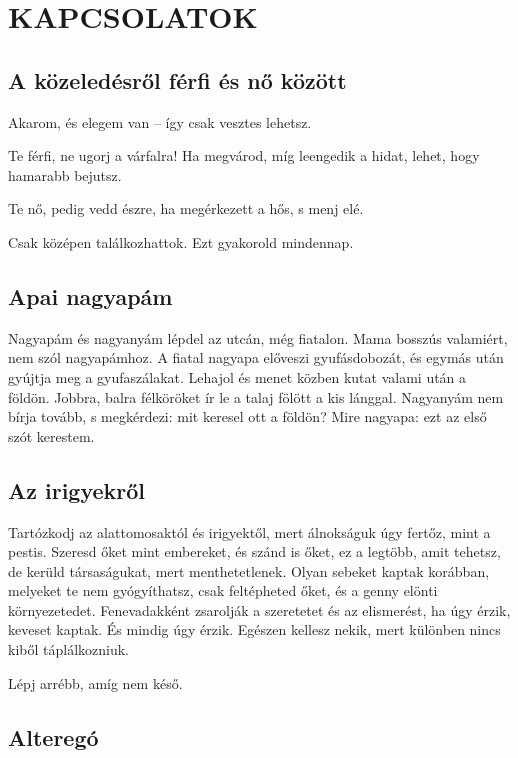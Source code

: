 \clearpage
\chapter{KAPCSOLATOK}

\section{A közeledésről férfi és nő között}

Akarom, és elegem van -- így csak vesztes lehetsz.

Te férfi, ne ugorj a várfalra! Ha megvárod, míg leengedik a hidat,
lehet, hogy hamarabb bejutsz.

Te nő, pedig vedd észre, ha megérkezett a hős, s menj elé.

Csak középen találkozhattok. Ezt gyakorold mindennap.

\section{Apai nagyapám}

Nagyapám és nagyanyám lépdel az utcán, még fiatalon. Mama
bosszús valamiért, nem szól nagyapámhoz. A fiatal nagyapa előveszi
gyufásdobozát, és egymás után gyújtja meg a gyufaszálakat. Lehajol és
menet közben kutat valami után a földön. Jobbra, balra félköröket ír le
a talaj fölött a kis lánggal. Nagyanyám nem bírja tovább, s megkérdezi:
mit keresel ott a földön? Mire nagyapa: ezt az első szót kerestem.

\section{Az irigyekről}

Tartózkodj az alattomosaktól és irigyektől, mert álnokságuk úgy
fertőz, mint a pestis. Szeresd őket mint embereket, és szánd is őket,
ez a legtöbb, amit tehetsz, de kerüld társaságukat, mert menthetetlenek.
Olyan sebeket kaptak korábban, melyeket te nem gyógyíthatsz,
csak feltépheted őket, és a genny elönti környezetedet. Fenevadakként
zsarolják a szeretetet és az elismerést, ha úgy érzik, keveset kaptak. És
mindig úgy érzik. Egészen kellesz nekik, mert különben nincs kiből
táplálkozniuk.

Lépj arrébb, amíg nem késő.

\section{Alteregó}


